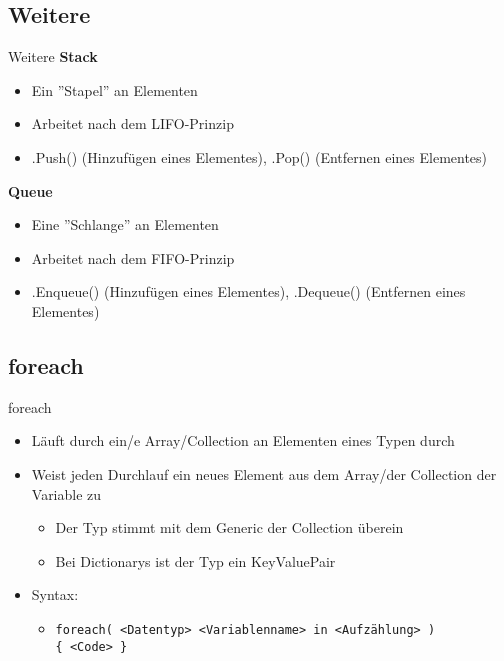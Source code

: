 \subsection{Weitere}
\begin{frame}{Weitere}
	\textbf{Stack}\\
	\begin{itemize}
		\item Ein ''Stapel'' an Elementen
		\item Arbeitet nach dem LIFO-Prinzip
		\item \alert{.Push()} (Hinzufügen eines Elementes), \alert{.Pop()} (Entfernen eines Elementes)
	\end{itemize}
	
	\textbf{Queue}\\
	\begin{itemize}
		\item Eine ''Schlange'' an Elementen
		\item Arbeitet nach dem FIFO-Prinzip
		\item \alert{.Enqueue()} (Hinzufügen eines Elementes), \alert{.Dequeue()} (Entfernen eines Elementes)
	\end{itemize}
	
\end{frame}

\subsection{foreach}
\begin{frame}{foreach}
	\begin{itemize}
		\item Läuft durch ein/e Array/Collection an Elementen eines Typen durch 
		\item Weist jeden Durchlauf ein neues Element aus dem Array/der Collection der Variable zu
		\begin{itemize}
			\item Der Typ stimmt mit dem Generic der Collection überein
			\item Bei Dictionarys ist der Typ ein \alert{KeyValuePair}		
		\end{itemize}
		\item Syntax:
		\begin{itemize}
			\item \texttt{foreach( \alert{<Datentyp> <Variablenname>} in \alert{<Aufzählung>} )\\ \{ \alert{<Code>} \}}
		\end{itemize}
	\end{itemize}
		
\end{frame}

